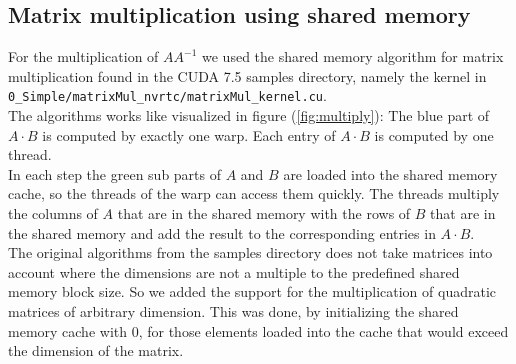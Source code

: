 \subsection*{Matrix multiplication using shared memory}
For the multiplication of $AA^{-1}$ we used the shared memory algorithm for matrix multiplication found in the CUDA 7.5 samples directory, namely the kernel in \texttt{0\_Simple/matrixMul\_nvrtc/matrixMul\_kernel.cu}.\\
The algorithms works like visualized in figure (\ref{fig:multiply}):
The blue part of $A \cdot B$ is computed by exactly one warp. Each entry of $A \cdot B$ is computed by one thread.\\ 
In each step the green sub parts of $A$ and $B$ are loaded into the shared memory cache, so the threads of the warp can access them quickly. The threads multiply the columns of $A$ that are in the shared memory with the rows of $B$ that are in the shared memory and add the result to the corresponding entries in $A \cdot B$.
\vspace{0.3cm}\\
The original algorithms from the samples directory does not take matrices into account where the dimensions are not a multiple to the predefined shared memory block size. So we added the support for the multiplication of quadratic matrices of arbitrary dimension. This was done, by initializing the shared memory cache with 0, for those elements loaded into the cache that would exceed the dimension of the matrix.
